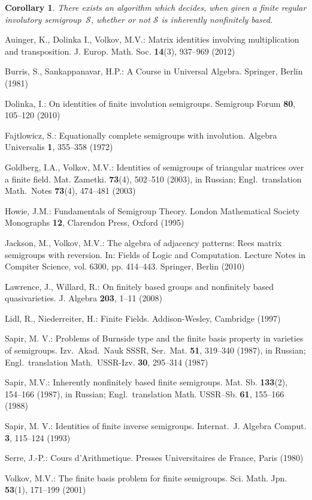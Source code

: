 \documentclass[11pt,reqno]{amsart}
\newcommand{\is}{involutory semi\-group}
\newcommand{\infb}{inherently non\-finitely based}
\newtheorem{Cor}[Thm]{Corollary}
\begin{document}
\begin{Cor}
There exists an algorithm which decides, when given a  finite regular \is\ $\mathcal{S}$, whether or not $\mathcal{S}$ is \infb.
\end{Cor}


\begin{thebibliography}{99}
Auinger, K., Dolinka I., Volkov, M.V.: Matrix identities involving multiplication and transposition. J. Europ. Math. Soc. \textbf{14}(3),
937--969 (2012)

Burris, S., Sankappanavar, H.P.: A Course in Universal Algebra. Springer, Berlin (1981)

Dolinka, I.: On identities of finite involution semigroups. Semigroup Forum \textbf{80}, 105--120 (2010)

Fajtlowicz, S.: Equationally complete semigroups with involution. Algebra Universalis \textbf{1}, 355--358 (1972)

Goldberg, I.A., Volkov, M.V.: Identities of semigroups of triangular matrices over a finite field. Mat. Zametki. \textbf{73}(4), 502--510
(2003), in Russian; Engl.\ translation Math.\ Notes \textbf{73}(4), 474--481 (2003)

Howie, J.M.: Fundamentals of Semigroup Theory. London Mathematical Society Monographs \textbf{12}, Clarendon Press, Oxford (1995)

Jackson, M., Volkov, M.V.: The algebra of adjacency patterns: Rees matrix semigroups with reversion. In: Fields of Logic and Computation.
Lecture Notes in Compiter Science, vol. 6300, pp. 414--443. Springer, Berlin (2010)

Lawrence, J.,  Willard, R.: On finitely based groups and nonfinitely based quasivarieties. J. Algebra \textbf{203}, 1--11 (2008)

Lidl, R., Niederreiter, H.: Finite Fields. Addison-Wesley, Cambridge (1997)

Sapir, M. V.: Problems of Burnside type and the finite basis property in varieties of semigroups. Izv.\ Akad.\ Nauk SSSR, Ser.\ Mat.
\textbf{51}, 319--340 (1987), in Russian; Engl.\ translation Math.\ USSR-Izv. \textbf{30}, 295--314 (1987)

Sapir, M.V.: Inherently nonfinitely based finite semigroups. Mat. Sb. \textbf{133}(2), 154--166 (1987), in Russian; Engl.\ translation
Math. USSR--Sb. \textbf{61}, 155--166 (1988)

Sapir, M. V.: Identities of finite inverse semigroups. Internat.\ J. Algebra Comput. \textbf{3}, 115--124 (1993)

Serre, J.-P.: Cours d'Arithmetique. Presses Universitaires de France, Paris (1980)

Volkov, M.V.: The finite basis problem for finite semigroups. Sci. Math. Jpn. \textbf{53}(1), 171--199 (2001)
\end{thebibliography}
\end{document}
